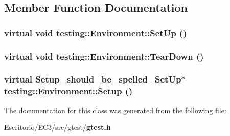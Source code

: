 \subsection{Member Function Documentation}
\subsubsection{\setlength{\rightskip}{0pt plus 5cm}virtual void testing::Environment::SetUp ()\hspace{0.3cm}{\tt  [inline, virtual]}}\label{classtesting_1_1Environment_562c61c7087bc48651cfc1557af349ef}


\subsubsection{\setlength{\rightskip}{0pt plus 5cm}virtual void testing::Environment::TearDown ()\hspace{0.3cm}{\tt  [inline, virtual]}}\label{classtesting_1_1Environment_84a68fe128e6d09494c01c6031c0d8f7}


\subsubsection{\setlength{\rightskip}{0pt plus 5cm}virtual {\bf Setup\_\-should\_\-be\_\-spelled\_\-SetUp}$\ast$ testing::Environment::Setup ()\hspace{0.3cm}{\tt  [inline, private, virtual]}}\label{classtesting_1_1Environment_4c1b9884d3ce6eb9a9866ea3b328c0c1}




The documentation for this class was generated from the following file:\begin{CompactItemize}
\item 
Escritorio/EC3/src/gtest/{\bf gtest.h}\end{CompactItemize}
